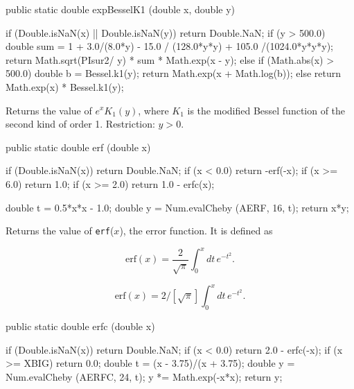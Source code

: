 \begin{htmlonly}
\end{htmlonly}
\begin{code}

   public static double expBesselK1 (double x, double y)\begin{hide} {
      if (Double.isNaN(x) || Double.isNaN(y))
         return Double.NaN;
      if (y > 500.0) {
           double sum = 1 + 3.0/(8.0*y) - 15.0 / (128.0*y*y) + 105.0 /(1024.0*y*y*y);
           return Math.sqrt(PIsur2/ y) * sum * Math.exp(x - y);
      } else if (Math.abs(x) > 500.0) {
         double b = Bessel.k1(y);
         return Math.exp(x + Math.log(b));
      } else {
         return Math.exp(x) * Bessel.k1(y);
      }
   }\end{hide}
\end{code}
\begin{tabb}
Returns the value of $e^x K_1(y)$, where $ K_1$ is the modified Bessel
function of the second kind of order 1. Restriction: $y > 0$.
\end{tabb}
\begin{code}

   public static double erf (double x)\begin{hide} {
      if (Double.isNaN(x))
         return Double.NaN;
      if (x < 0.0)
         return -erf(-x);
      if (x >= 6.0)
         return 1.0;
      if (x >= 2.0)
         return 1.0 - erfc(x);

      double t = 0.5*x*x - 1.0;
      double y = Num.evalCheby (AERF, 16, t);
      return x*y;
   }\end{hide}
\end{code}
\begin{tabb}
Returns the value of \texttt{erf}($x$), the error function. It is defined as
\begin{latexonly}
\[
\mbox{erf}(x) = \frac2{\sqrt\pi}\int_0^x dt\, e^{-t^2}.
\]
\end{latexonly}
\begin{htmlonly}
\[
\mbox{erf}(x) = 2/[\sqrt\pi]\int_0^x dt\, e^{-t^2}.
\]
\end{htmlonly}
\begin{htmlonly}
\end{htmlonly}
\end{tabb}
\begin{code}

   public static double erfc (double x)\begin{hide} {
      if (Double.isNaN(x))
         return Double.NaN;
      if (x < 0.0)
         return 2.0 - erfc(-x);
      if (x >= XBIG)
         return 0.0;
      double t = (x - 3.75)/(x + 3.75);
      double y = Num.evalCheby (AERFC, 24, t);
      y *= Math.exp(-x*x);
      return y;
   }\end{hide}
\end{code}
